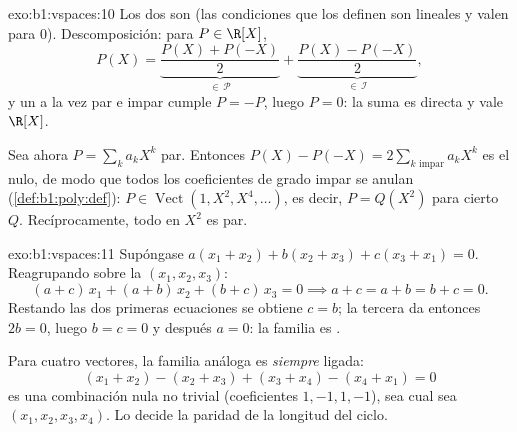 \begin{solution}{exo:b1:vspaces:10}
Los dos  son  (las condiciones que los
definen son lineales y valen para $0$). Descomposición: para
$P \in \R[X]$,
\[
P(X) = \underbrace{\frac{P(X) + P(-X)}{2}}_{\in\,\mathcal P}
+ \underbrace{\frac{P(X) - P(-X)}{2}}_{\in\,\mathcal I},
\]
y un  a la vez par e impar cumple $P = -P$, luego $P = 0$:
la suma es directa y vale $\R[X]$.

Sea ahora $P = \sum_k a_k X^k$ par. Entonces
$P(X) - P(-X) = 2 \sum_{k \text{ impar}} a_k X^k$ es el 
nulo, de modo que todos los coeficientes de grado impar se anulan
(\cref{def:b1:poly:def}): $P \in \operatorname{Vect}(1, X^2, X^4,
\dots)$, es decir, $P = Q(X^2)$ para cierto  $Q$.
Recíprocamente, todo  en $X^2$ es par.
\end{solution}

\begin{solution}{exo:b1:vspaces:11}
Supóngase $a(x_1 + x_2) + b(x_2 + x_3) + c(x_3 + x_1) = 0$.
Reagrupando sobre la  $(x_1, x_2, x_3)$:
\[
(a + c)\,x_1 + (a + b)\,x_2 + (b + c)\,x_3 = 0
\implies a + c = a + b = b + c = 0 .
\]
Restando las dos primeras ecuaciones se obtiene $c = b$; la tercera
da entonces $2b = 0$, luego $b = c = 0$ y después $a = 0$: la familia
es .

Para cuatro vectores, la familia análoga es \emph{siempre} ligada:
\[
(x_1 + x_2) - (x_2 + x_3) + (x_3 + x_4) - (x_4 + x_1) = 0
\]
es una combinación nula no trivial (coeficientes $1, -1, 1, -1$), sea
cual sea $(x_1, x_2, x_3, x_4)$. Lo decide la paridad de la longitud
del ciclo.
\end{solution}

